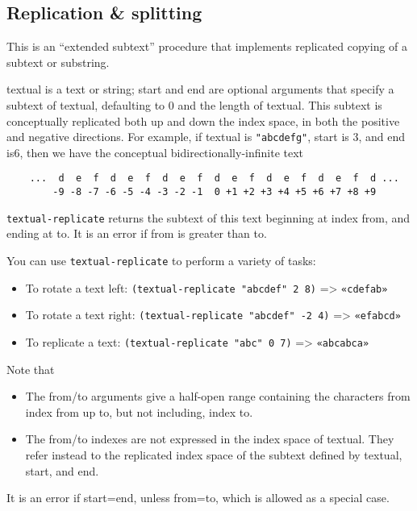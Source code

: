 \subsection{{Replication \& splitting}}\label{replication-splitting}

\begin{entry}{%
  }

  This is an ``extended subtext'' procedure that
  implements replicated copying of a subtext or substring.

  textual is a text or string; start and end are optional arguments
  that specify a subtext of textual, defaulting to 0 and the length of
  textual.  This subtext is conceptually replicated both up and down
  the index space, in both the positive and negative directions. For
  example, if textual is \texttt{"abcdefg"}, start is 3, and end is6,
  then we have the conceptual bidirectionally-infinite text

\begin{verbatim}
    ...  d  e  f  d  e  f  d  e  f  d  e  f  d  e  f  d  e  f  d ...
        -9 -8 -7 -6 -5 -4 -3 -2 -1  0 +1 +2 +3 +4 +5 +6 +7 +8 +9
\end{verbatim}

  \texttt{textual-replicate} returns the subtext of this text
  beginning at index from, and ending at to. It is an error if from is
  greater than to.

  You can use \texttt{textual-replicate} to perform a variety of
  tasks:

\begin{itemize}
  \tightlist
\item To rotate a text left: \texttt{(textual-replicate\ "abcdef"\ 2\
    8)} => \texttt{«cdefab»}
\item To rotate a text right: \texttt{(textual-replicate\ "abcdef"\
    -2\ 4)} => \texttt{«efabcd»}
\item To replicate a text: \texttt{(textual-replicate\ "abc"\ 0\ 7)}
  => \texttt{«abcabca»}
\end{itemize}

Note that

\begin{itemize}
  \tightlist
\item The from/to arguments give a half-open range containing the
  characters from index from up to, but not including, index to.
\item The from/to indexes are not expressed in the index space of
  textual.  They refer instead to the replicated index space of the
  subtext defined by textual, start, and end.
\end{itemize}

It is an error if start=end, unless from=to, which is allowed as a
special case.
\end{entry}

